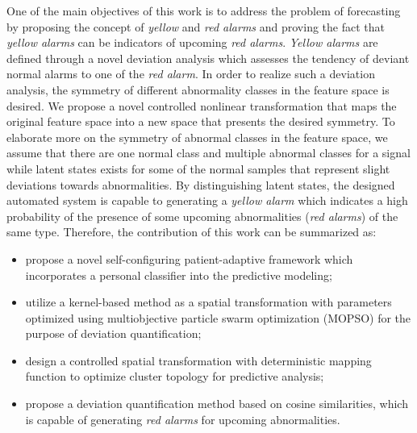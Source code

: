 
One of the main objectives of this work is to address the problem of forecasting by proposing the concept of \textit{yellow} and \textit{red alarms} and proving the fact that \textit{yellow alarms} can be indicators of upcoming \textit{red alarms}. \textit{Yellow alarms} are defined through a novel deviation analysis which assesses  the tendency of deviant normal alarms to one of the \textit{red alarm}. In order to realize such a deviation analysis, the symmetry of different abnormality classes in the feature space is desired. We propose a novel controlled nonlinear transformation that maps the original feature space into a new space that presents the desired symmetry. %
To elaborate more on the symmetry of abnormal classes in the feature space, we assume that there are one normal class and multiple abnormal classes for a signal while latent states exists for some of the normal samples that represent slight deviations towards abnormalities. %
By distinguishing  latent states, the designed automated system is capable to generating a \textit{yellow alarm} which indicates a high probability of the presence of some upcoming abnormalities (\textit{red alarms}) of the same type. Therefore, the contribution of this work can be summarized as:

\begin{itemize}
    \item propose a novel self-configuring patient-adaptive framework which incorporates a personal classifier into the predictive modeling;
    \item utilize a kernel-based method as a spatial transformation with parameters optimized using multiobjective particle swarm optimization (MOPSO) for the purpose of deviation quantification;
    \item design a controlled spatial transformation with deterministic mapping function to optimize cluster topology for predictive analysis;
    \item propose a deviation quantification method based on cosine similarities, which is capable of generating \textit{red alarms} for upcoming abnormalities.
\end{itemize}


